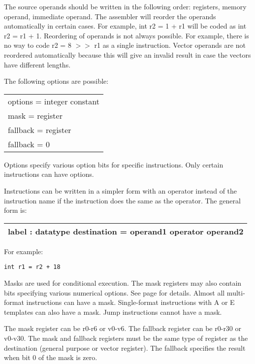 \documentclass[forwardcom.tex]{subfiles}
\begin{document}
The source operands should be written in the following order: registers, memory operand, immediate operand. The assembler will reorder the operands automatically in certain cases. For example, int r2 = 1 + r1 will be coded as int r2 = r1 + 1. Reordering of operands is not always possible. For example, there is no way to code r2 = 8 $>>$ r1 as a single instruction. Vector operands are not reordered automatically because this will give an invalid result in case the vectors have different lengths.
\vspace{4mm}

The following options are possible:\\
\begin{tabular}{|p{140mm}|}
\hline
options = integer constant\\
mask = register\\
fallback = register\\
fallback = 0\\
\hline
\end{tabular}
\vv

Options specify various option bits for specific instructions. 
Only certain instructions can have options.
\vv

Instructions can be written in a simpler form with an operator instead of the instruction name if the instruction does the same as the operator. The general form is:
\vv

\begin{tabular}{|p{140mm}|}
\hline
\hspace{4mm} label : datatype destination = operand1 operator operand2 \\
\hline
\end{tabular}
\vspace{4mm}

For example:
\begin{lstlisting}[frame=single]
int r1 = r2 + 18
\end{lstlisting}
\vv


Masks are used for conditional execution. The mask registers may also contain bits specifying various numerical options. See page \pageref{MaskAndFallback} for details. 
Almost all multi-format instructions can have a mask. Single-format instructions with A or E templates can also have a mask. Jump instructions cannot have a mask.
\vv

The mask register can be r0-r6 or v0-v6. The fallback register can be r0-r30 or v0-v30. 
The mask and fallback registers must be the same type of register as the destination (general purpose or vector register). The fallback specifies the result when bit 0 of the mask is zero.
\vv
\end{document}
